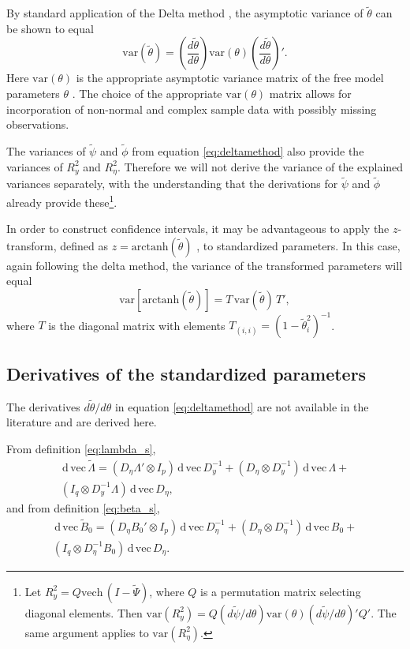 \documentclass[a4paper,11pt]{article}
\newcommand{\n}{\eta}
\renewcommand{\d}{\,\mathrm{d}\,}
\newcommand{\kronprod}{\otimes}
\renewcommand{\vec}{\mathrm{vec}\,}
\newcommand{\vech}{\mathrm{vech}\,}
\newcommand{\Lambdastan}{\tilde{\Lambda}}
\newcommand{\Bstan}{\tilde{B}}
\newcommand{\thetastan}{\tilde{\theta}}
\newcommand{\0}{\boldsymbol{0}}
\newcommand{\var}{\mathrm{var}}
\newcommand{\arctanh}{\mathrm{arctanh}}
\begin{document}

By standard application of the Delta method \citep[e.g.][]{oehlert1992note}, the asymptotic variance of $\thetastan$ can be shown to equal
\begin{equation}\label{eq:deltamethod}
\var(\thetastan) = 
	\left(\frac{d \thetastan}{d \theta}\right) 
		\var(\theta) 
	\left(\frac{d \thetastan}{d \theta}\right)'.
\end{equation}
Here $\var(\theta)$ is the appropriate asymptotic variance matrix of the free model parameters $\theta$ \cite[e.g.][143-4]{satorra1989alternative}.
The choice of the appropriate $\var(\theta)$ matrix allows for incorporation of 
non-normal and complex sample data with possibly missing observations.

The variances of $\tilde\psi$ and $\tilde\phi$ from equation \ref{eq:deltamethod} also provide the 
variances of $R^2_y$ and $R^2_\n$. 
Therefore we will not derive the variance of the explained
variances separately, with the understanding that the derivations for $\tilde\psi$ and $\tilde\phi$ already provide these\footnote{
Let $R^2_y = Q \vech(I - \tilde\Psi)$, where $Q$ is a permutation matrix 
selecting diagonal elements. Then $\var(R^2_y) = Q (d\tilde\psi/d\theta) \var(\theta) (d\tilde\psi/d\theta)' Q'$. The same
argument applies to $\var(R^2_\n)$.}.

In order to construct confidence intervals, it may be advantageous to apply the 
$z$-transform, defined as $z = \arctanh(\thetastan)$  \citep[section 35]{fisher1925statistical}, to standardized parameters.
In this case, again following the delta method, the variance of the transformed parameters will equal
\begin{equation}\label{eq:deltamethod-ztransform}
\var[\arctanh(\thetastan)] = 
		T\,
		\var(\thetastan)\,
		T',
\end{equation}
where $T$ is the diagonal matrix with elements $T_{(i,i)} = (1 - \thetastan_i^2)^{-1}$.

\subsection{Derivatives of the standardized parameters}


The derivatives $d \thetastan / d \theta$ in equation \ref{eq:deltamethod} are not available in the literature and are derived here.

From definition \ref{eq:lambda_s}, 
\begin{multline}\label{eq:dveclam}
\d\vec\Lambdastan = 
    (D_\n \Lambda' \kronprod I_p) \d \vec D_y^{-1} + 
    (D_\n \kronprod D_y^{-1}) \d\vec\Lambda + \\
    (I_q \kronprod D_y^{-1} \Lambda) \d\vec D_\n,
\end{multline}
and from definition \ref{eq:beta_s}, 
\begin{multline}\label{eq:dvecbeta}
\d\vec \Bstan_0 = 
    (D_\n B_0' \kronprod I_p) \d \vec D_\n^{-1} + 
    (D_\n \kronprod D_\n^{-1}) \d\vec B_0 + \\
    (I_q \kronprod D_\n^{-1} B_0) \d\vec D_\n.
\end{multline}
\end{document}
